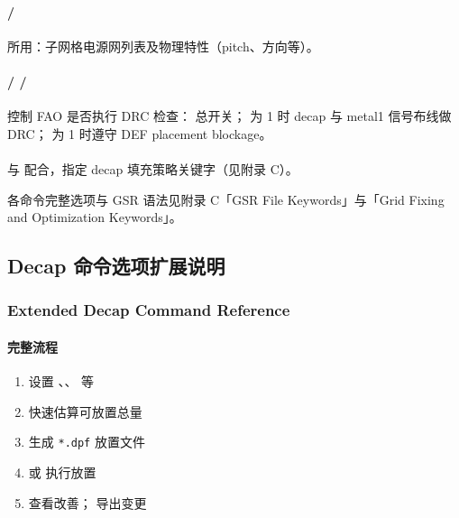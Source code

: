 \begin{seeAlsoBox}
\paragraph{ / }
 所用：子网格电源网列表及物理特性（pitch、方向等）。

\paragraph{ /  / }
控制 FAO 是否执行 DRC 检查： 总开关； 为 1 时 decap 与 metal1 信号布线做 DRC； 为 1 时遵守 DEF placement blockage。

\paragraph{}
与  配合，指定 decap 填充策略关键字（见附录 C）。

各命令完整选项与 GSR 语法见附录 C「GSR File Keywords」与「Grid Fixing and Optimization Keywords」。
\end{seeAlsoBox}


\subsection{Decap 命令选项扩展说明}
\subsubsection*{Extended Decap Command Reference}

\paragraph{ 完整流程}
\begin{enumerate}
  \item 设置 、、 等
  \item {} 快速估算可放置总量
  \item {} 生成 \texttt{*.dpf} 放置文件
  \item {} 或  执行放置
  \item {} 查看改善； 导出变更
\end{enumerate}

